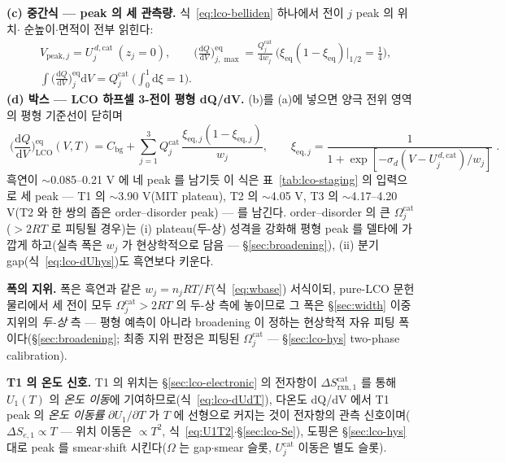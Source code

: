 \documentclass[11pt,a4paper]{article}
\newcommand{\dd}{\mathrm{d}}
\newcommand{\eq}{\mathrm{eq}}
\newcommand{\bg}{\mathrm{bg}}
\newcommand{\rxn}{\mathrm{rxn}}
\begin{document}
\textbf{(c) 중간식 — peak 의 세 관측량.} 식~\eqref{eq:lco-belliden} 하나에서 전이 $j$ peak 의 위치$\cdot$
순높이$\cdot$면적이 전부 읽힌다:
\begin{equation}
\begin{aligned}
&V_{\mathrm{peak},j}=U_j^{\,d,\mathrm{cat}}\ (z_j{=}0),\qquad
\Big(\frac{\dd Q}{\dd V}\Big)^{\eq}_{j,\max}=\frac{Q_j^\mathrm{cat}}{4w_j}\ \Big(\xi_\eq(1{-}\xi_\eq)\big|_{1/2}{=}\tfrac14\Big),\\
&\int\Big(\frac{\dd Q}{\dd V}\Big)^{\eq}_{j}\dd V=Q_j^\mathrm{cat}\ \Big(\textstyle\int_0^1\dd\xi=1\Big).
\end{aligned}
\label{eq:lco-peakobs}
\end{equation}
\textbf{(d) 박스 — LCO 하프셀 3-전이 평형 dQ/dV.} (b)를 (a)에 넣으면 양극 전위 영역의 평형 기준선이 닫히며
\begin{equation}
\boxed{\;\Big(\frac{\dd Q}{\dd V}\Big)^{\eq}_\mathrm{LCO}(V,T)
=C_\bg+\sum_{j=1}^{3}Q_j^\mathrm{cat}\,
\frac{\xi_{\eq,j}(1-\xi_{\eq,j})}{w_j},
\qquad \xi_{\eq,j}=\frac{1}{1+\exp[-\sigma_d(V-U_j^{\,d,\mathrm{cat}})/w_j]}\;.}
\label{eq:lco-eqpeak}
\end{equation}
흑연이 $\sim$0.085--0.21 V 에 네 peak 를 남기듯 이 식은 표~\ref{tab:lco-staging} 의 입력으로 세 peak —
T1 의 $\sim$3.90 V(MIT plateau), T2 의 $\sim$4.05 V, T3 의 $\sim$4.17--4.20 V(T2 와 한 쌍의 좁은
order--disorder peak) — 를 남긴다. order--disorder 의 큰 $\Omega_j^\mathrm{cat}$($>2RT$ 로 피팅될 경우)는
(i) plateau(두-상) 성격을 강화해 평형 peak 를 델타에 가깝게 하고(실측 폭은 $w_j$ 가 현상학적으로 담음 —
\S\ref{sec:broadening}), (ii) 분기 gap(식~\eqref{eq:lco-dUhys})도 흑연보다 키운다.

\textbf{폭의 지위.} 폭은 흑연과 같은 $w_j=n_jRT/F$(식~\eqref{eq:wbase}) 서식이되, pure-LCO 문헌 물리에서 세
전이 모두 $\Omega_j^\mathrm{cat}>2RT$ 의 두-상 측에 놓이므로 그 폭은 \S\ref{sec:width} 이중지위의
\emph{두-상} 측 — 평형 예측이 아니라 broadening 이 정하는 현상학적 자유 피팅 폭이다(\S\ref{sec:broadening};
최종 지위 판정은 피팅된 $\Omega_j^\mathrm{cat}$ — \S\ref{sec:lco-hys} two-phase calibration).

\textbf{T1 의 온도 신호.} T1 의 위치는 \S\ref{sec:lco-electronic} 의 전자항이 $\Delta S_{\rxn,1}^\mathrm{cat}$ 를 통해 $U_1(T)$ 의
\emph{온도 이동}에 기여하므로(식~\eqref{eq:lco-dUdT}), 다온도 dQ/dV 에서 T1 peak 의 \emph{온도 이동률}
$\partial U_1/\partial T$ 가 $T$ 에 선형으로 커지는 것이 전자항의 관측 신호이며($\Delta S_{e,1}\propto T$ —
위치 이동은 $\propto T^2$, 식~\eqref{eq:U1T2}$\cdot$\S\ref{sec:lco-Se}), 도핑은 \S\ref{sec:lco-hys} 대로 peak 를 smear$\cdot$shift 시킨다($\Omega$ 는
gap$\cdot$smear 슬롯, $U_j^\mathrm{cat}$ 이동은 별도 슬롯).
\end{document}
